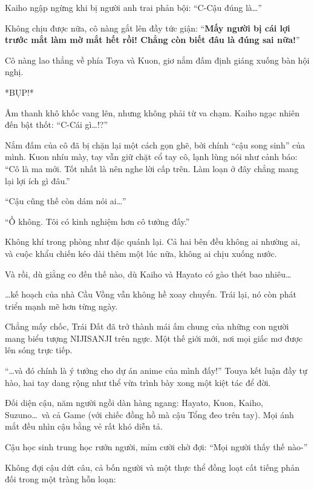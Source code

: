 \documentclass[../main.tex]{subfiles}
\begin{document}
Kaiho ngập ngừng khi bị người anh trai phản bội: ``C-Cậu đúng là\dots''

Không chịu được nữa, cô nàng gắt lên đầy tức giận: ``\textbf{Mấy người bị cái lợi trước mắt làm mờ mắt hết rồi! Chẳng còn biết đâu là đúng sai nữa!}''

Cô nàng lao thẳng về phía Toya và Kuon, giơ nắm đấm định giáng xuống bàn hội nghị.

*BỤP!*

Âm thanh khô khốc vang lên, nhưng không phải từ va chạm. Kaiho ngạc nhiên đến bật thốt: ``C-Cái gì\dots!?''

Nắm đấm của cô đã bị chặn lại một cách gọn ghẽ, bởi chính ``cậu song sinh'' của mình. Kuon nhíu mày, tay vẫn giữ chặt cổ tay cô, lạnh lùng nói như cảnh báo: ``Cô là ma mới. Tốt nhất là nên nghe lời cấp trên. Làm loạn ở đây chẳng mang lại lợi ích gì đâu.''

``Cậu cũng thế còn dám nói ai\dots''

``Ồ không. Tôi có kinh nghiệm hơn cô tưởng đấy.''

Không khí trong phòng như đặc quánh lại. Cả hai bên đều không ai nhường ai, và cuộc khẩu chiến kéo dài thêm một lúc nữa, không ai chịu xuống nước.

Và rồi, dù giằng co đến thế nào, dù Kaiho và Hayato có gào thét bao nhiêu\dots

\dots kế hoạch của nhà Cầu Vồng vẫn không hề xoay chuyển. Trái lại, nó còn phát triển mạnh mẽ hơn từng ngày.

Chẳng mấy chốc, Trái Đất đã trở thành mái ấm chung của những con người mang biểu tượng NIJISANJI trên ngực. Một thế giới mới, nơi mọi giấc mơ được lên sóng trực tiếp.

\omk

``\dots và đó chính là ý tưởng cho dự án anime của mình đấy!'' Touya kết luận đầy tự hào, hai tay dang rộng như thể vừa trình bày xong một kiệt tác để đời.


Đối diện cậu, năm người ngồi dàn hàng ngang: Hayato, Kuon, Kaiho, Suzuno\dots\ và cả Game (với chiếc đồng hồ mà cậu Tổng đeo trên tay). Mọi ánh mắt đều nhìn cậu bằng vẻ rất khó diễn tả.

Cậu học sinh trung học rướn người, mỉm cười chờ đợi: ``Mọi người thấy thế nào-''

Không đợi cậu dứt câu, cả bốn người và một thực thể đồng loạt cất tiếng phản đối trong một tràng hỗn loạn:
\end{document}
